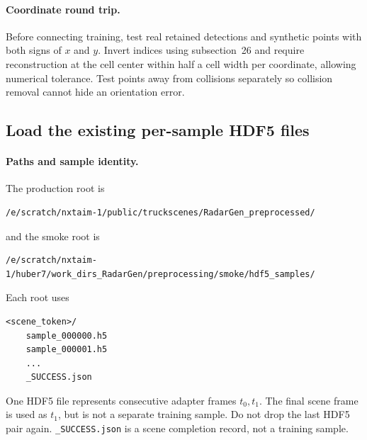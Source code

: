 \documentclass[11pt,a4paper]{article}
\begin{document}
\paragraph{Coordinate round trip.}
Before connecting training, test real retained detections and synthetic points with both signs of \(x\) and \(y\). Invert indices using subsection~26 and require reconstruction at the cell center within half a cell width per coordinate, allowing numerical tolerance. Test points away from collisions separately so collision removal cannot hide an orientation error.

\subsection{Load the existing per-sample HDF5 files}

\paragraph{Paths and sample identity.}
The production root is
\begin{lstlisting}
/e/scratch/nxtaim-1/public/truckscenes/RadarGen_preprocessed/
\end{lstlisting}
and the smoke root is
\begin{lstlisting}
/e/scratch/nxtaim-1/huber7/work_dirs_RadarGen/preprocessing/smoke/hdf5_samples/
\end{lstlisting}
Each root uses
\begin{lstlisting}
<scene_token>/
    sample_000000.h5
    sample_000001.h5
    ...
    _SUCCESS.json
\end{lstlisting}
One HDF5 file represents consecutive adapter frames \(t_0,t_1\). The final scene frame is used as \(t_1\), but is not a separate training sample. Do not drop the last HDF5 pair again. \texttt{\_SUCCESS.json} is a scene completion record, not a training sample.
\end{document}

